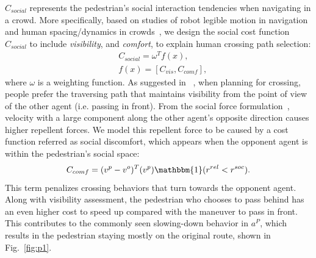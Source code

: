 \documentclass[conference]{IEEEtran}
\begin{document}
$C_{social}$ represents the pedestrian's social interaction tendencies when 
navigating in a crowd. More specifically, based on
studies of robot legible motion in 
navigation~\cite{kruse2012legible,lichtenthaler2012influence} and human 
spacing/dynamics in crowds~\cite{helbing1995social,hall1966hidden}, we design 
the social cost function $C_{social}$ to include \textit{visibility}, and \textit{comfort}, 
to explain human crossing path selection:
\begin{equation}~\label{eq:social_cost}
  \begin{aligned}
    &C_{social} = \omega^T f(x), \\
    &f(x) = [C_{vis}, C_{comf}],
  \end{aligned}
\end{equation}
where $\omega$ is a weighting function.
As suggested in ~\cite{kruse2012legible}, when planning for crossing, people 
prefer the traversing path that maintains visibility from the point of view of 
the other agent (i.e. passing in front).
From the social force formulation~\cite{helbing1995social}, velocity with a 
large component along the other agent's opposite direction 
causes higher repellent forces.
We model this repellent force to be caused by a cost function referred
as social discomfort, 
which appears when the opponent agent is within the pedestrian's social space:
\begin{equation}
  C_{comf} = (v^p-v^o)^T (v^p) \mathbbm{1}(r^{rel}<r^{soc}).
\end{equation}
This term penalizes crossing behaviors that turn towards the opponent agent. 
Along with visibility assessment, the pedestrian who chooses to pass 
behind has an even higher cost to speed up compared with the maneuver to pass 
in front. This contributes to the commonly seen slowing-down behavior in $a^P$, 
which results in the pedestrian staying mostly on the original route, 
shown in Fig.~\ref{fig:p1}.
\end{document}
